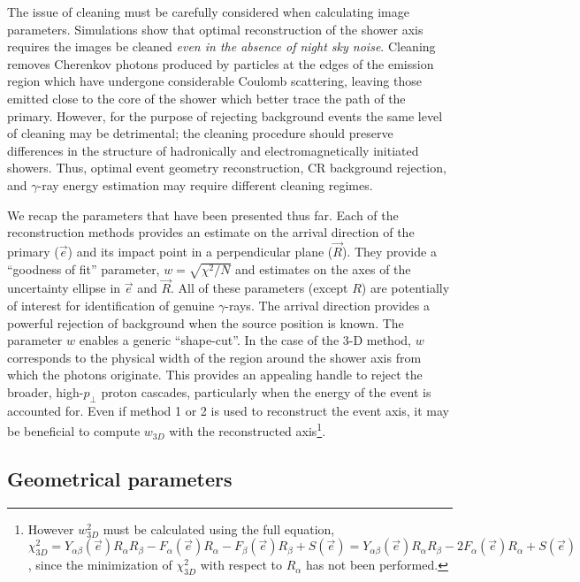 \documentclass[letterpaper]{article}
\begin{document}
The issue of cleaning must be carefully considered when calculating
image parameters. Simulations show that optimal reconstruction of the
shower axis requires the images be cleaned \textit{even in the absence
of night sky noise}. Cleaning removes Cherenkov photons produced by
particles at the edges of the emission region which have undergone
considerable Coulomb scattering, leaving those emitted close to the
core of the shower which better trace the path of the
primary. However, for the purpose of rejecting background events the
same level of cleaning may be detrimental; the cleaning procedure
should preserve differences in the structure of hadronically and
electromagnetically initiated showers. Thus, optimal event geometry 
reconstruction, CR background rejection, and $\gamma$-ray energy 
estimation may require different cleaning regimes.

We recap the parameters that have been presented thus far. Each of
the reconstruction methods provides an estimate on the arrival
direction of the primary ($\vec{e}$) and its impact point in a
perpendicular plane ($\vec{R}$). They provide a ``goodness of fit''
parameter, $w=\sqrt{\chi^2/N}$ and estimates on the axes of the
uncertainty ellipse in $\vec{e}$ and $\vec{R}$. All of these
parameters (except $R$) are potentially of interest for identification
of genuine $\gamma$-rays. The arrival direction provides a powerful
rejection of background when the source position is known. The
parameter $w$ enables a generic ``shape-cut''. In the case of the
3-D method, $w$ corresponds to the physical width of the region around
the shower axis from which the photons originate.  This provides an
appealing handle to reject the broader, high-$p_\perp$ proton
cascades, particularly when the energy of the event is accounted
for. Even if method 1 or 2 is used to reconstruct the event axis, it
may be beneficial to compute $w_{3D}$ with the reconstructed
axis\footnote{However $w_{3D}^2$ must be calculated using the full
equation, $\chi_{3D}^{2}
=Y_{\alpha\beta}(\vec{e})R_{\alpha}R_{\beta}-F_{\alpha}(\vec{e})R_{\alpha}
-F_{\beta}(\vec{e})R_{\beta}+S(\vec{e})
=Y_{\alpha\beta}(\vec{e})R_{\alpha}R_{\beta}-2F_{\alpha}(\vec{e})R_{\alpha}
+S(\vec{e})$, since the minimization of $\chi_{3D}^{2}$ with respect
to $R_{\alpha}$ has not been performed.}.

\subsection{Geometrical parameters}
\end{document}
